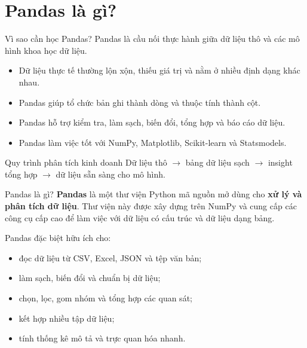 \documentclass[aspectratio=169,11pt]{beamer}
\newcommand{\key}[1]{\textbf{\textcolor{AccentGreen}{#1}}}
\begin{document}
\section{Pandas là gì?}


\begin{frame}{Vì sao cần học Pandas?}
\small
Pandas là cầu nối thực hành giữa dữ liệu thô và các mô hình khoa học dữ liệu.
\begin{itemize}
  \item Dữ liệu thực tế thường lộn xộn, thiếu giá trị và nằm ở nhiều định dạng khác nhau.
  \item Pandas giúp tổ chức bản ghi thành dòng và thuộc tính thành cột.
  \item Pandas hỗ trợ kiểm tra, làm sạch, biến đổi, tổng hợp và báo cáo dữ liệu.
  \item Pandas làm việc tốt với NumPy, Matplotlib, Scikit-learn và Statsmodels.
\end{itemize}
\begin{block}{Quy trình phân tích kinh doanh}
Dữ liệu thô $\rightarrow$ bảng dữ liệu sạch $\rightarrow$ insight tổng hợp $\rightarrow$ dữ liệu sẵn sàng cho mô hình.
\end{block}
\end{frame}

\begin{frame}{Pandas là gì?}
\small
\key{Pandas} là một thư viện Python mã nguồn mở dùng cho \key{xử lý và phân tích dữ liệu}.
Thư viện này được xây dựng trên NumPy và cung cấp các công cụ cấp cao để làm việc với dữ liệu có cấu trúc và dữ liệu dạng bảng.
\vspace{0.4em}

Pandas đặc biệt hữu ích cho:
\begin{itemize}
  \item đọc dữ liệu từ CSV, Excel, JSON và tệp văn bản;
  \item làm sạch, biến đổi và chuẩn bị dữ liệu;
  \item chọn, lọc, gom nhóm và tổng hợp các quan sát;
  \item kết hợp nhiều tập dữ liệu;
  \item tính thống kê mô tả và trực quan hóa nhanh.
\end{itemize}
\end{frame}
\end{document}
